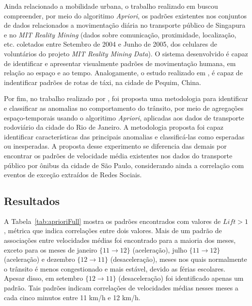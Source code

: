\documentclass[
	12pt,				%
	oneside,			%
	a4paper,			%
	english,			%
	brazil				%
	]{abntex2ppgsi}
\begin{document}
{{{Ainda relacionado a mobilidade urbana, o trabalho realizado em \cite{zeng2017visual} buscou compreender, por meio do algoritimo \textit{Apriori}, os padrões existentes nos conjuntos de dados relacionados a movimentação diária no transporte público de Singapura e no \textit{MIT Reality Mining}  (dados sobre comunicação, proximidade, localização, etc. coletados entre Setembro de 2004 e Junho de 2005, dos celulares de voluntários do projeto \textit{MIT Reality Mining Data}). O sistema desenvolvido é capaz de identificar e apresentar visualmente padrões de movimentação humana, em relação ao espaço e ao tempo. Analogamente, o estudo realizado em \cite{yu2018discovering}, é capaz de indentificar padrões de rotas de táxi, na cidade de Pequim, China.

Por fim, no trabalho realizado por \cite{cruz2018detecccao}, foi proposta uma metodologia para identificar e classificar as anomalias no comportamento do trânsito, por meio de agregações espaço-temporais usando o algoritimo \textit{Apriori}, aplicadas aos dados de transporte rodoviário  da cidade do Rio de Janeiro. A metodologia proposta foi capaz identificar características das principais anomalias e classificá-las como esperadas ou inesperadas. A proposta desse experimento se diferencia das demais por encontrar os padrões de velocidade média existentes nos dados do transporte público por ônibus da cidade de São Paulo, considerando ainda a correlação com eventos de exceção extraídos de Redes Sociais.

\subsection{Resultados}



A Tabela~\ref{tab:aprioriFull} mostra os padrões encontrados com valores de $\textit{Lift} > 1$, métrica que indica correlações entre dois valores.  Mais de um padrão de associações entre velocidades médias foi encontrado para a maioria dos meses, exceto para os meses de janeiro   $\lbrace 11 \rightarrow 12 \rbrace$ (aceleração), julho $\lbrace 11 \rightarrow 12\rbrace$ (aceleração) e dezembro $\lbrace12 \rightarrow 11\rbrace$ (desaceleração), meses nos quais normalmente o trânsito é menos congestionado e mais estável, devido as férias escolares. Apesar disso, em setembro $\lbrace12 \rightarrow 11\rbrace$ (desaceleração) foi identificado apenas um padrão. Tais padrões indicam correlações de velocidades médias nesses meses a cada cinco minutos entre 11 km/h e 12 km/h. 

}}}
\end{document}

